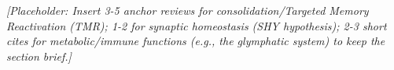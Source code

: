 \textit{[Placeholder: Insert 3-5 anchor reviews for consolidation/Targeted Memory Reactivation (TMR); 1-2 for synaptic homeostasis (SHY hypothesis); 2-3 short cites for metabolic/immune functions (e.g., the glymphatic system) to keep the section brief.]}